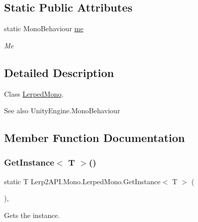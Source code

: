 \subsection*{Static Public Attributes}
\begin{DoxyCompactItemize}
\item 
static Mono\+Behaviour \hyperlink{class_lerp2_a_p_i_1_1_mono_1_1_lerped_mono_a230428e35a8be741c1c220da4f5aea91}{me}
\begin{DoxyCompactList}\small\item\em Me \end{DoxyCompactList}\end{DoxyCompactItemize}


\subsection{Detailed Description}
Class \hyperlink{class_lerp2_a_p_i_1_1_mono_1_1_lerped_mono}{Lerped\+Mono}. 

\begin{DoxySeeAlso}{See also}
Unity\+Engine.\+Mono\+Behaviour


\end{DoxySeeAlso}


\subsection{Member Function Documentation}
\mbox{\label{class_lerp2_a_p_i_1_1_mono_1_1_lerped_mono_afe3ab7d89480e841defb5a7a31a06d07}} 
\subsubsection{\texorpdfstring{Get\+Instance$<$ T $>$()}{GetInstance< T >()}}
{\footnotesize\ttfamily static T Lerp2\+A\+P\+I.\+Mono.\+Lerped\+Mono.\+Get\+Instance$<$ T $>$ (\begin{DoxyParamCaption}{ }\end{DoxyParamCaption})\hspace{0.3cm}{\ttfamily [inline]}, {\ttfamily [static]}}



Gets the instance. 


